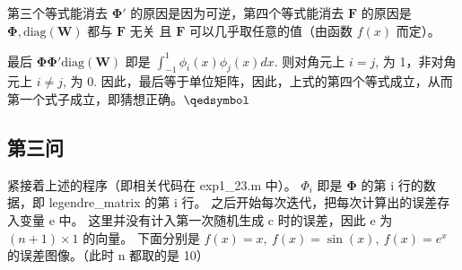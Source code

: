 \documentclass[11pt]{ctexart}
\begin{document}
	\vspace{1em}
	第三个等式能消去 \(\mathbf{\Phi'}\) 的原因是因为可逆，第四个等式能消去 \(\mathbf{F}\) 的原因是 \(\mathbf{\Phi},\text{diag}(\mathbf{W})\) 都与 \(\mathbf{F}\) 无关
	且 \(\mathbf{F}\) 可以几乎取任意的值（由函数 \(f(x)\) 而定）。

	最后 \(\mathbf{\Phi}\mathbf{\Phi'}\text{diag}(\mathbf{W})\) 即是 \(\int_{-1}^{1} \phi_{i}(x) \phi_{j}(x) d x\).
	则对角元上 \(i=j\), 为 1，非对角元上 \(i\neq j\), 为 0.
	因此，最后等于单位矩阵，因此，上式的第四个等式成立，从而第一个式子成立，即猜想正确。\hfill\(\qedsymbol\)

	\subsection{第三问}
	紧接着上述的程序（即相关代码在 exp1\_23.m 中）。
	\(\Phi_{i}\) 即是 \(\mathbf{\Phi}\) 的第 i 行的数据，即 legendre\_matrix 的第 i 行。
	之后开始每次迭代，把每次计算出的误差存入变量 e 中。
	这里并没有计入第一次随机生成 c 时的误差，因此 e 为 \((n+1)\times 1\) 的向量。
	下面分别是 \(f(x)=x,\ f(x)=\sin(x),\ f(x)=e^x\) 的误差图像。（此时 n 都取的是 10）
\end{document}
